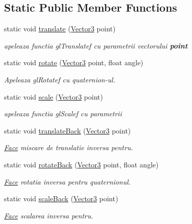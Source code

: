 \subsection*{Static Public Member Functions}
\begin{DoxyCompactItemize}
\item 
static void \hyperlink{struct_vector3_a19c258342bd0c27ddcd7e079d6d38b5f}{translate} (\hyperlink{struct_vector3}{Vector3} point)
\begin{DoxyCompactList}\small\item\em apeleaza functia gl\-Translatef cu parametrii vectorului {\bfseries point} \end{DoxyCompactList}\item 
static void \hyperlink{struct_vector3_a55239686f46937c64fec068f52a4d5b6}{rotate} (\hyperlink{struct_vector3}{Vector3} point, float angle)
\begin{DoxyCompactList}\small\item\em Apeleaza gl\-Rotatef cu quaternion-\/ul. \end{DoxyCompactList}\item 
static void \hyperlink{struct_vector3_a31279b5d53f5cf4f36f8a02ba826844b}{scale} (\hyperlink{struct_vector3}{Vector3} point)
\begin{DoxyCompactList}\small\item\em apeleaza functia gl\-Scalef cu parametrii \end{DoxyCompactList}\item 
static void \hyperlink{struct_vector3_a44b36db62c048090ee7b7eef7ce4ba3e}{translate\-Back} (\hyperlink{struct_vector3}{Vector3} point)
\begin{DoxyCompactList}\small\item\em \hyperlink{struct_face}{Face} miscare de translatie inversa pentru. \end{DoxyCompactList}\item 
static void \hyperlink{struct_vector3_a7fcc44e050a023b53c0745e6d7068019}{rotate\-Back} (\hyperlink{struct_vector3}{Vector3} point, float angle)
\begin{DoxyCompactList}\small\item\em \hyperlink{struct_face}{Face} rotatia inversa pentru quaternionul. \end{DoxyCompactList}\item 
static void \hyperlink{struct_vector3_a5a586e78bef39b3f2d22e30883aab5cb}{scale\-Back} (\hyperlink{struct_vector3}{Vector3} point)
\begin{DoxyCompactList}\small\item\em \hyperlink{struct_face}{Face} scalarea inversa pentru. \end{DoxyCompactList}\item 

\end{DoxyCompactItemize}
